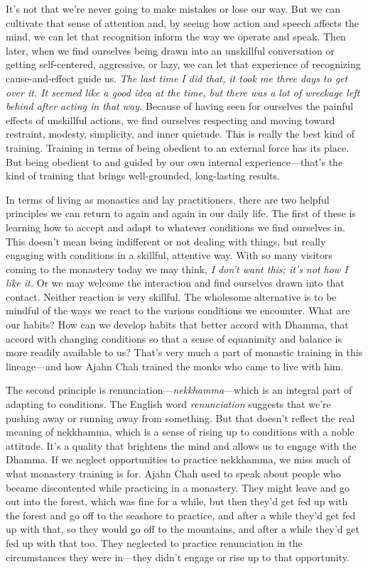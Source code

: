 It's not that we're never going to make mistakes or lose our way. But 
we can cultivate that sense of attention and, by seeing how action and 
speech affects the mind, we can let that recognition inform the way we 
operate and speak. Then later, when we find ourselves being drawn into 
an unskillful conversation or getting self-centered, aggressive, or 
lazy, we can let that experience of recognizing cause-and-effect guide 
us. \emph{The last time I did that, it took me three days to get over 
it. It seemed like a good idea at the time, but there was a lot of 
wreckage left behind after acting in that way.} Because of having seen 
for ourselves the painful effects of unskillful actions, we find 
ourselves respecting and moving toward restraint, modesty, simplicity, 
and inner quietude. This is really the best kind of training. Training 
in terms of being obedient to an external force has its place. But 
being obedient to and guided by our own internal experience---that's 
the kind of training that brings well-grounded, long-lasting results.


In terms of living as monastics and lay practitioners, there are two 
helpful principles we can return to again and again in our daily life. 
The first of these is learning how to accept and adapt to whatever 
conditions we find ourselves in. This doesn't mean being indifferent or 
not dealing with things, but really engaging with conditions in a 
skillful, attentive way. With so many visitors coming to the monastery 
today we may think, \emph{I don't want this; it's not how I like it.} 
Or we may welcome the interaction and find ourselves drawn into that 
contact. Neither reaction is very skillful. The wholesome alternative 
is to be mindful of the ways we react to the various conditions we 
encounter. What are our habits? How can we develop habits that better 
accord with Dhamma, that accord with changing conditions so that a 
sense of equanimity and balance is more readily available to us? That's 
very much a part of monastic training in this lineage---and how Ajahn 
Chah trained the monks who came to live with him.

The second principle is renunciation---\emph{nekkhamma}---which is an 
integral part of adapting to conditions. The English word 
\emph{renunciation} suggests that we're pushing away or running away 
from something. But that doesn't reflect the real meaning of nekkhamma, 
which is a sense of rising up to conditions with a noble attitude. It's 
a quality that brightens the mind and allows us to engage with the 
Dhamma. If we neglect opportunities to practice nekkhamma, we miss much 
of what monastery training is for. Ajahn Chah used to speak about 
people who became discontented while practicing in a monastery. They 
might leave and go out into the forest, which was fine for a while, but 
then they'd get fed up with the forest and go off to the seashore to 
practice, and after a while they'd get fed up with that, so they would 
go off to the mountains, and after a while they'd get fed up with that 
too. They neglected to practice renunciation in the circumstances they 
were in---they didn't engage or rise up to that opportunity.

